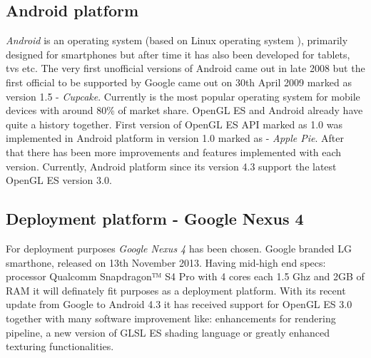 \subsection{Android platform}
\emph{Android} \cite{androidcom} is an operating system (based on Linux operating system \cite{gnulinux}), primarily designed for smartphones but after time it has also been developed for tablets, tvs etc.
The very first unofficial versions of Android came out in late 2008 but the first official to be supported by Google came out on 30th April 2009 marked as version 1.5 - \emph{Cupcake}.
\newline Currently is the most popular operating system for mobile devices with around 80\% of market share.
OpenGL ES and Android already have quite a history together.
First version of OpenGL ES API marked as 1.0 was implemented in Android platform in version 1.0 marked as - \emph{Apple Pie}.
After that there has been more improvements and features implemented with each version.
Currently, Android platform since its version 4.3 support the latest OpenGL ES version 3.0.

\subsection{Deployment platform - Google Nexus 4}
For deployment purposes \emph{Google Nexus 4} has been chosen.
Google branded LG smarthone, released on 13th November 2013.
\newline Having mid-high end specs: processor Qualcomm Snapdragon™ S4 Pro with 4 cores each 1.5 Ghz and 2GB of RAM it will definately fit purposes as a deployment platform.
\newline With its recent update from Google to Android 4.3 it has received support for OpenGL ES 3.0 together with many software improvement like: enhancements for rendering pipeline, a new version of GLSL ES shading language or greatly enhanced texturing functionalities.